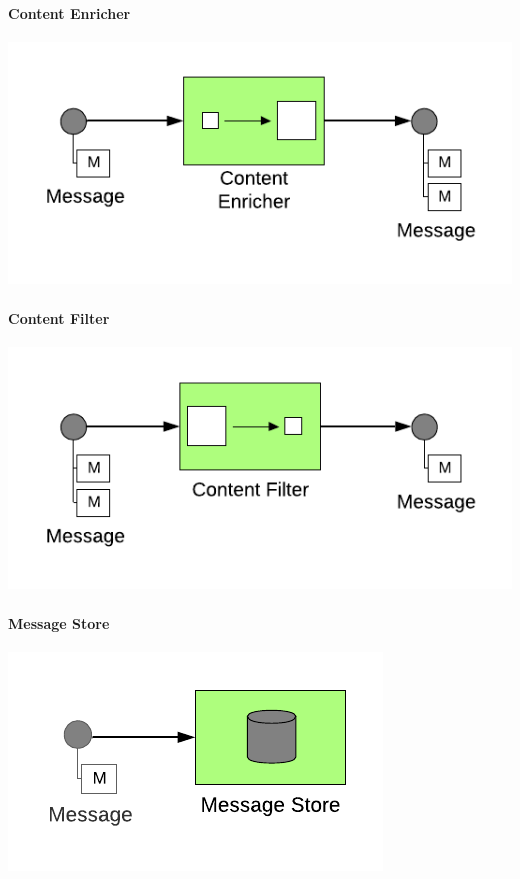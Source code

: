 \paragraph{Content Enricher}

\begin{center}
    \includegraphics[scale=0.6]{Diagrams/Messaging/9. Content Enricher.pdf}
\end{center}

\paragraph{Content Filter}

\begin{center}
    \includegraphics[scale=0.6]{Diagrams/Messaging/10. Content Filter.pdf}
\end{center}

\paragraph{Message Store}

\begin{center}
    \includegraphics[scale=0.6]{Diagrams/Messaging/11. Message Store.pdf}
\end{center}

